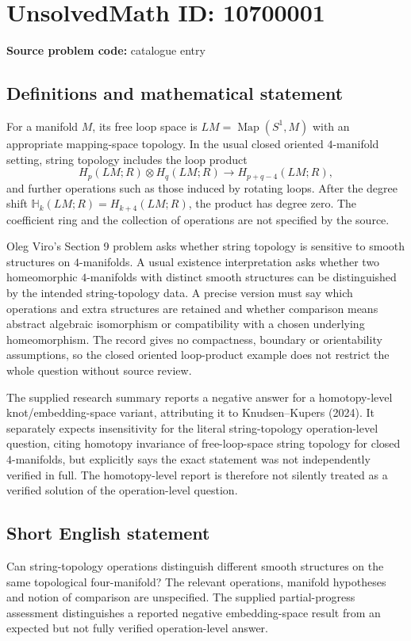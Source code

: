 \documentclass[11pt]{article}
\begin{document}
\section*{UnsolvedMath ID: 10700001}
\textbf{Source problem code:} catalogue entry
\subsection{Definitions and mathematical statement}
For a manifold \(M\), its free loop space is \(LM=\operatorname{Map}(S^1,M)\) with an appropriate mapping-space topology. In the usual closed oriented \(4\)-manifold setting, string topology includes the loop product
\[
 H_p(LM;R)\otimes H_q(LM;R)
       \longrightarrow H_{p+q-4}(LM;R),
\]
and further operations such as those induced by rotating loops. After the degree shift \(\mathbb H_k(LM;R)=H_{k+4}(LM;R)\), the product has degree zero. The coefficient ring and the collection of operations are not specified by the source.

Oleg Viro's Section 9 problem asks whether string topology is sensitive to smooth structures on \(4\)-manifolds. A usual existence interpretation asks whether two homeomorphic \(4\)-manifolds with distinct smooth structures can be distinguished by the intended string-topology data. A precise version must say which operations and extra structures are retained and whether comparison means abstract algebraic isomorphism or compatibility with a chosen underlying homeomorphism. The record gives no compactness, boundary or orientability assumptions, so the closed oriented loop-product example does not restrict the whole question without source review.

The supplied research summary reports a negative answer for a homotopy-level knot/embedding-space variant, attributing it to Knudsen--Kupers (2024). It separately expects insensitivity for the literal string-topology operation-level question, citing homotopy invariance of free-loop-space string topology for closed \(4\)-manifolds, but explicitly says the exact statement was not independently verified in full. The homotopy-level report is therefore not silently treated as a verified solution of the operation-level question.
\subsection{Short English statement}
Can string-topology operations distinguish different smooth structures on the same topological four-manifold? The relevant operations, manifold hypotheses and notion of comparison are unspecified. The supplied partial-progress assessment distinguishes a reported negative embedding-space result from an expected but not fully verified operation-level answer.
\end{document}
